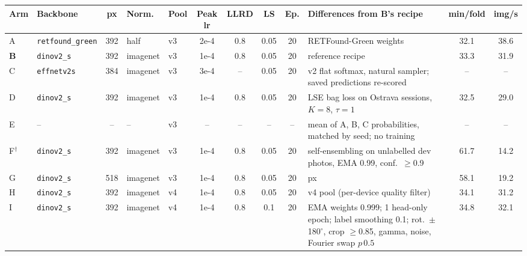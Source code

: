 \begin{tabular}{@{}llcllcccc>{\raggedright\arraybackslash}p{6.2cm}cc@{}}
\toprule
Arm & Backbone & px & Norm. & Pool & Peak lr & LLRD & LS & Ep. & Differences from B's recipe & min/fold & img/s\\
\midrule
A & \texttt{retfound\_green} & 392 & half & v3 & 2e-4 & 0.8 & 0.05 & 20 & RETFound-Green weights & 32.1 & 38.6 \\
\textbf{B} & \texttt{dinov2\_s} & 392 & imagenet & v3 & 1e-4 & 0.8 & 0.05 & 20 & reference recipe & 33.3 & 31.9 \\
C & \texttt{effnetv2s} & 384 & imagenet & v3 & 3e-4 & -- & 0.05 & 20 & v2 flat softmax, natural sampler; saved predictions re-scored & -- & -- \\
D & \texttt{dinov2\_s} & 392 & imagenet & v3 & 1e-4 & 0.8 & 0.05 & 20 & LSE bag loss on Ostrava sessions, $K{=}8$, $\tau{=}1$ & 32.5 & 29.0 \\
E & -- & -- & -- & v3 & -- & -- & -- & -- & mean of A, B, C probabilities, matched by seed; no training & -- & -- \\
F$^\dagger$ & \texttt{dinov2\_s} & 392 & imagenet & v3 & 1e-4 & 0.8 & 0.05 & 20 & self-ensembling on unlabelled dev photos, EMA 0.99, conf.\ $\ge$0.9 & 61.7 & 14.2 \\
G & \texttt{dinov2\_s} & 518 & imagenet & v3 & 1e-4 & 0.8 & 0.05 & 20 & 518 px & 58.1 & 19.2 \\
H & \texttt{dinov2\_s} & 392 & imagenet & v4 & 1e-4 & 0.8 & 0.05 & 20 & v4 pool (per-device quality filter) & 34.1 & 31.2 \\
I & \texttt{dinov2\_s} & 392 & imagenet & v4 & 1e-4 & 0.8 & 0.1 & 20 & EMA weights 0.999; 1 head-only epoch; label smoothing 0.1; rot.\ $\pm$180$^\circ$, crop $\ge$0.85, gamma, noise, Fourier swap $p\,0.5$ & 34.8 & 32.1 \\
\bottomrule
\end{tabular}
